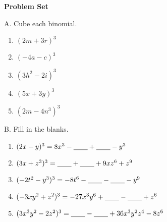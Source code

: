 \textbf{Problem Set}

\vspce

A. Cube each binomial.     
\begin{enumerate}

\item \hspce $(2m + 3r)^{3}$
\item \hspce $(-4a - c)^{3}$
\item \hspce $(3h^{2} - 2i)^{3}$
\item \hspce $(5x + 3y)^{3}$
\item \hspce $(2m - 4n^{3})^{3}$

\end{enumerate}

B. Fill in the blanks. 
\begin{enumerate}[label = \arabic*. ]
\item \hspce $(2x - y)^{3} =  8 x^{3} - \underline{\hspace{2em}}  + \underline{\hspace{2em}}  - y^{3}$
\item \hspce $(3x + z^3)^{3} = \underline{\hspace{2em}}  + \underline{\hspace{2em}}  + 9 x z^{6} + z^{9}$
\item \hspce $(-2t^2 - y^3)^{3} = - 8 t^{6} - \underline{\hspace{2em}}  - \underline{\hspace{2em}}  - y^{9} $
\item \hspce $(-3xy^2 + z^2 )^{3} = - 27 x^{3} y^{6} + \underline{\hspace{2em}}  - \underline{\hspace{2em}}  + z^{6}$
\item \hspce $(3x^3y^2 - 2z^2)^{3} = \underline{\hspace{2em}}  - \underline{\hspace{2em}}  + 36 x^{3} y^{2} z^{4} - 8 z^{6}$
\end{enumerate}  
